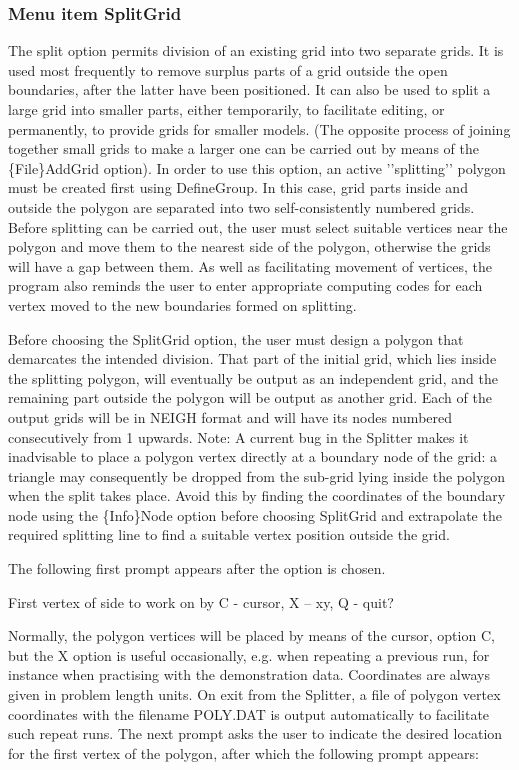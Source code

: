 \documentclass{article}
\begin{document}
\bigskip

\subsubsection[Menu item SplitGrid]{Menu item SplitGrid}
The split option permits division of an existing grid into two separate grids. It is used most frequently to remove surplus parts of a grid outside the open boundaries, after the latter have been positioned. It can also be used to split a large grid into smaller parts, either temporarily, to facilitate editing, or permanently, to provide grids for smaller models. (The opposite process of joining together small grids to make a larger one can be carried out by means of the \{File\}AddGrid option). In order to use this option, an active '{}'splitting'{}' polygon must be created first using DefineGroup. In this case, grid parts inside and outside the polygon are separated into two self-consistently numbered grids. Before splitting can be carried out, the user must select suitable vertices near the polygon and move them to the nearest side of the polygon, otherwise the grids will have a gap between them. As well as facilitating movement of vertices, the program also reminds the user to enter appropriate computing 
codes for each vertex moved to the new boundaries formed on splitting.

Before choosing the SplitGrid option, the user must design a polygon that demarcates the intended division. That part of the initial grid, which lies inside the splitting polygon, will eventually be output as an independent grid, and the remaining part outside the polygon will be output as another grid. Each of the output grids will be in NEIGH format and will have its nodes numbered consecutively from 1 upwards. Note: A current bug in the Splitter makes it inadvisable to place a polygon vertex directly at a boundary node of the grid: a triangle may consequently be dropped from the sub-grid lying inside the polygon when the split takes place. Avoid this by finding the coordinates of the boundary node using the \{Info\}Node option before choosing SplitGrid and extrapolate the required splitting line to find a suitable vertex position outside the grid.

The following first prompt appears after the option is chosen.

First vertex of side to work on by C - cursor, X -- xy, Q - quit?

Normally, the polygon vertices will be placed by means of the cursor, option C, but the X option is useful occasionally, e.g. when repeating a previous run, for instance when practising with the demonstration data. Coordinates are always given in problem length units. On exit from the Splitter, a file of polygon vertex coordinates with the filename POLY.DAT is output automatically to facilitate such repeat runs. The next prompt asks the user to indicate the desired location for the first vertex of the polygon, after which the following prompt appears:
\end{document}

